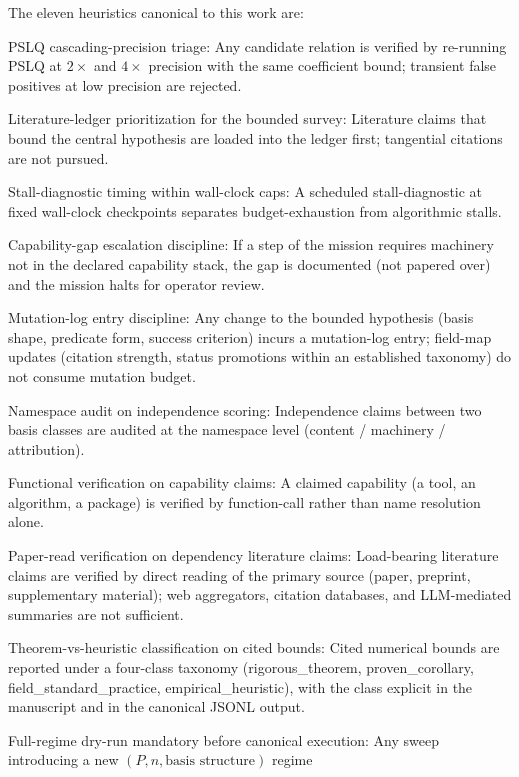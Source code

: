 \documentclass[11pt,a4paper]{article}
\newcommand{\fsp}{\textsf{field\_standard\_practice}}
\newcommand{\pc}{\textsf{proven\_corollary}}
\newcommand{\rt}{\textsf{rigorous\_theorem}}
\newcommand{\eh}{\textsf{empirical\_heuristic}}
\begin{document}
The eleven heuristics canonical to this work are:
\begin{description}[itemsep=2pt,topsep=2pt]
\item[H1.] PSLQ cascading-precision triage:
  Any candidate relation is verified by re-running PSLQ at $2\times$ and
  $4\times$ precision with the same coefficient bound; transient false
  positives at low precision are rejected.
\item[H2.] Literature-ledger prioritization for the bounded survey:
  Literature claims that bound the central hypothesis are loaded into the
  ledger first; tangential citations are not pursued.
\item[H3.] Stall-diagnostic timing within wall-clock caps:
  A scheduled stall-diagnostic at fixed wall-clock checkpoints separates
  budget-exhaustion from algorithmic stalls.
\item[H4.] Capability-gap escalation discipline:
  If a step of the mission requires machinery not in the declared
  capability stack, the gap is documented (not papered over) and the
  mission halts for operator review.
\item[H5.] Mutation-log entry discipline:
  Any change to the bounded hypothesis (basis shape, predicate form,
  success criterion) incurs a mutation-log entry; field-map updates
  (citation strength, status promotions within an established taxonomy)
  do not consume mutation budget.
\item[H6.] Namespace audit on independence scoring:
  Independence claims between two basis classes are audited at the
  namespace level (content / machinery / attribution).
\item[H7.] Functional verification on capability claims:
  A claimed capability (a tool, an algorithm, a package) is verified by
  function-call rather than name resolution alone.
\item[H8.] Paper-read verification on dependency literature claims:
  Load-bearing literature claims are verified by direct reading of the
  primary source (paper, preprint, supplementary material); web aggregators,
  citation databases, and LLM-mediated summaries are not sufficient.
\item[H9.] Theorem-vs-heuristic classification on cited bounds:
  Cited numerical bounds are reported under a four-class taxonomy
  (\rt{}, \pc{}, \fsp{}, \eh{}), with the class explicit in the manuscript
  and in the canonical JSONL output.
\item[H10.] Full-regime dry-run mandatory before canonical execution:
  Any sweep introducing a new $(P, n, \text{basis structure})$ regime

\end{description}
\end{document}
